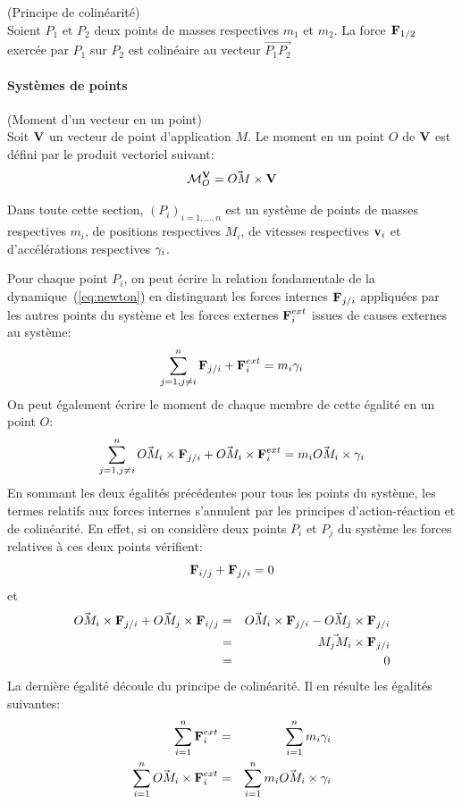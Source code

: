 \begin{mydef}(Principe de colinéarité)\\
  Soient $P_1$ et $P_2$ deux
  points de masses respectives $m_1$ et $m_2$. La force $\vect{F}_{1/2}$
  exercée par $P_1$ sur $P_2$ est colinéaire au vecteur $\vec{P_1P_2}$
\end{mydef}

\paragraph{Systèmes de points}

\begin{mydef}(Moment d'un vecteur en un point)\\
  Soit $\vect{V}$ un vecteur de point d'application $M$. Le moment en
  un point $O$ de $\vect{V}$ est défini par le produit vectoriel
  suivant:
  $$
  \moment{\vect{V}}{O} = \vec{OM} \crossprod \vect{V}
  $$
\end{mydef}

Dans toute cette section, $(P_i)_{i=1,...,n}$ est un système de points
de masses respectives $m_i$, de positions respectives $M_i$, de
vitesses respectives $\vi$ et d'accélérations respectives $\gammai$.

Pour chaque point $P_i$, on peut écrire la relation fondamentale de la
dynamique (\ref{eq:newton}) en distinguant les forces internes
$\vect{F}_{j/i}$ appliquées par les autres points du système et les
forces externes $\vect{F}^{ext}_{i}$
issues de causes externes au système:
$$
\sum_{j=1, j\not=i}^n \vect{F}_{j/i} + \vect{F}^{ext}_{i} = m_i
\gammai
$$
On peut également écrire le moment de chaque membre de cette égalité
en un point $O$:
$$
\sum_{j=1, j\not=i}^n \vec{OM_i}\crossprod \vect{F}_{j/i} +
\vec{OM_i}\crossprod\vect{F}^{ext}_{i} = m_i \vec{OM_i}\crossprod \gammai
$$
En sommant les deux égalités précédentes pour tous les points du
système, les termes relatifs aux forces internes s'annulent par les
principes d'action-réaction et de colinéarité. En effet, si on
considère deux points $P_i$ et $P_j$ du système les forces relatives
à ces deux points vérifient:
$$
\vect{F}_{i/j} + \vect{F}_{j/i} = 0
$$
et
\begin{eqnarray*}
\vec{OM_i}\crossprod \vect{F}_{j/i} + \vec{OM_j}\crossprod
\vect{F}_{i/j}&=&
\vec{OM_i}\crossprod \vect{F}_{j/i} - \vec{OM_j}\crossprod
\vect{F}_{j/i} \\
&=&
\vec{M_{j}M_{i}} \crossprod \vect{F}_{j/i} \\
&=& 0
\end{eqnarray*}
La dernière égalité découle du principe de colinéarité.
Il en résulte les égalités suivantes:
\begin{eqnarray}
\label{eq:1}
\sum_{i=1}^n \vect{F}^{ext}_{i} &=& \sum_{i=1}^n m_i \gammai \\
\label{eq:2}
\sum_{i=1}^n \vec{OM_i}\crossprod\vect{F}^{ext}_{i}
&=& \sum_{i=1}^n m_i \vec{OM_i}\crossprod \gammai
\end{eqnarray}

